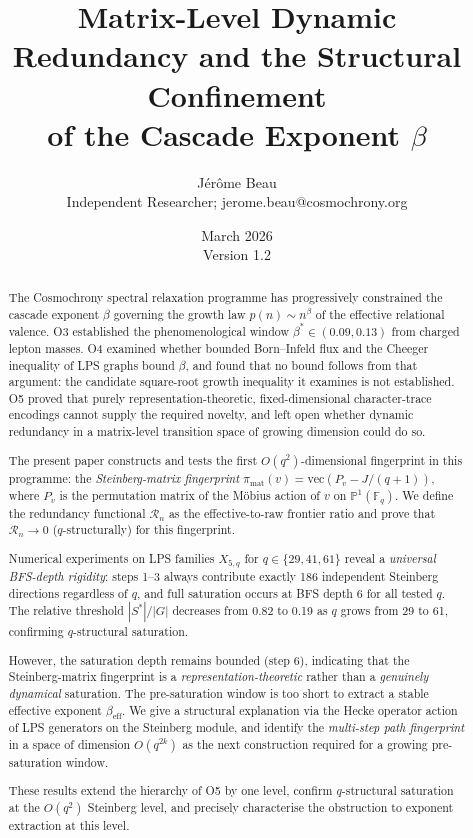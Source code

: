 \documentclass[11pt]{article}
\title{Matrix-Level Dynamic Redundancy and the Structural Confinement\\
of the Cascade Exponent $\beta$}
\author{J\'{e}r\^{o}me Beau\\
\small Independent Researcher; jerome.beau@cosmochrony.org}
\date{March 2026\\Version 1.2}
\theoremstyle{definition}
\theoremstyle{remark}
\newcommand{\F}{\mathbb{F}}
\newcommand{\beff}{\beta_{\mathrm{eff}}}
\newcommand{\Rn}{\mathcal{R}_n}
\begin{document}
  \maketitle

  \begin{abstract}
    The Cosmochrony spectral relaxation programme has progressively constrained the cascade
    exponent $\beta$ governing the growth law $p(n) \sim n^\beta$ of the effective relational
    valence.
    O3 established the phenomenological window $\beta^* \in (0.09, 0.13)$ from charged lepton
    masses.
    O4 examined whether bounded Born--Infeld flux and the Cheeger inequality of LPS graphs bound
    $\beta$, and found that no bound follows from that argument: the candidate square-root growth
    inequality it examines is not established.
    O5 proved that purely representation-theoretic, fixed-dimensional character-trace encodings
    cannot supply the required novelty, and left open whether dynamic redundancy in a matrix-level
    transition space of growing dimension could do so.

    The present paper constructs and tests the first $O(q^2)$-dimensional fingerprint in
    this programme: the \emph{Steinberg-matrix fingerprint}
    $\pi_{\mathrm{mat}}(v) = \mathrm{vec}(P_v - J/(q+1))$,
    where $P_v$ is the permutation matrix of the M\"{o}bius action of $v$ on
    $\mathbb{P}^1(\F_q)$.
    We define the redundancy functional $\Rn$ as the effective-to-raw frontier ratio
    and prove that $\Rn \to 0$ ($q$-structurally) for this fingerprint.

    Numerical experiments on LPS families $X_{5,q}$ for $q \in \{29, 41, 61\}$ reveal a
    \emph{universal BFS-depth rigidity}: steps 1--3 always contribute exactly 186
    independent Steinberg directions regardless of $q$, and full saturation occurs at BFS
    depth 6 for all tested $q$.
    The relative threshold $|S^*|/|G|$ decreases from 0.82 to 0.19 as $q$ grows from 29
    to 61, confirming $q$-structural saturation.

    However, the saturation depth remains bounded (step 6), indicating that the
    Steinberg-matrix fingerprint is a \emph{representation-theoretic} rather than a
    \emph{genuinely dynamical} saturation.
    The pre-saturation window is too short to extract a stable effective exponent $\beff$.
    We give a structural explanation via the Hecke operator action of LPS generators on the
    Steinberg module, and identify the \emph{multi-step path fingerprint} in a space of
    dimension $O(q^{2k})$ as the next construction required for a growing pre-saturation
    window.

    These results extend the hierarchy of O5 by one level, confirm $q$-structural saturation
    at the $O(q^2)$ Steinberg level, and precisely characterise the obstruction to
    exponent extraction at this level.
  \end{abstract}
\end{document}
